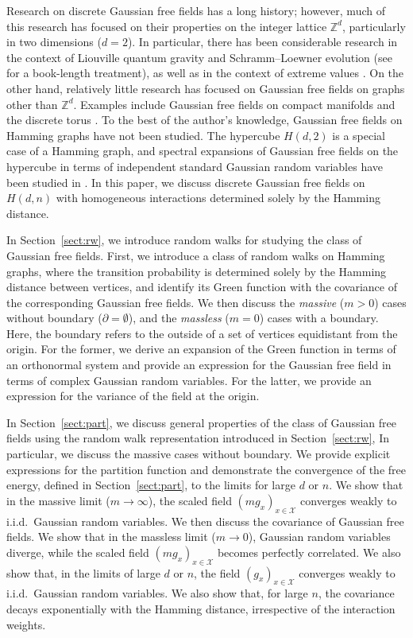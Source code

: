 \documentclass[a4paper,11pt]{article}
\theoremstyle{plain}
\theoremstyle{definition}
\begin{document}
Research on discrete Gaussian free fields has a long
history; however, much of this research has focused on
their properties on the integer lattice $\mathbb{Z}^d$,
particularly in two dimensions ($d=2$). In particular,
there has been considerable research in the context of
Liouville quantum gravity and Schramm--Loewner
evolution (see \cite{BP25} for a book-length treatment),
as well as in the context of extreme values
\cite{Biskup20}. On the other hand, relatively little
research has focused on Gaussian free fields on graphs
other than $\mathbb{Z}^d$. Examples include Gaussian
free fields on compact manifolds \cite{CG20} and
the discrete torus \cite{Abacherli19}. To the best of
the author's knowledge, Gaussian free fields on
Hamming graphs have not been studied. The hypercube
$H(d,2)$ is a special case of a Hamming graph, and
spectral expansions of Gaussian free fields on
the hypercube in terms of independent standard
Gaussian random variables have been studied in
\cite{CG25,Griffiths25}.
In this paper, we discuss discrete Gaussian free
fields on $H(d,n)$ with homogeneous interactions
determined solely by the Hamming distance.

In Section~\ref{sect:rw}, we introduce random walks
for studying the class of Gaussian free fields.
First, we introduce a class of random walks on
Hamming graphs, where the transition probability is
determined solely by the Hamming distance between
vertices, and identify its Green function with
the covariance of the corresponding Gaussian free
fields. We then discuss the {\it massive} ($m>0$)
cases without boundary ($\partial=\emptyset$), and
the {\it massless} ($m=0$) cases with a boundary.
Here, the boundary refers to the outside of a set
of vertices equidistant from the origin. For
the former, we derive an expansion of the Green
function in terms of an orthonormal system and
provide an expression for the Gaussian free field
in terms of complex Gaussian
random variables. For the latter, we provide
an expression for the variance of the field at
the origin.

In Section~\ref{sect:part}, we discuss general
properties of the class of Gaussian free fields using
the random walk representation introduced in
Section~\ref{sect:rw}, In particular, we discuss
the massive cases without boundary. We provide
explicit expressions for the partition function
and demonstrate the convergence of the free energy,
defined in Section~\ref{sect:part}, to the limits for
large $d$ or $n$. We show that in the massive limit
($m\to\infty$), the scaled field
$(mg_x)_{x\in\mathcal{X}}$ converges weakly to i.i.d.\
Gaussian random variables. We then discuss
the covariance of Gaussian free fields. We show that
in the massless limit ($m\to 0$), Gaussian random
variables diverge, while the scaled field
$(mg_x)_{x\in\mathcal{X}}$ becomes perfectly correlated.
We also show that, in the limits of large $d$ or $n$,
the field $(g_x)_{x\in\mathcal{X}}$ converges weakly to
i.i.d.\ Gaussian random variables. We also show that,
for large $n$, the covariance decays exponentially with
the Hamming distance, irrespective of the interaction
weights.
\end{document}
